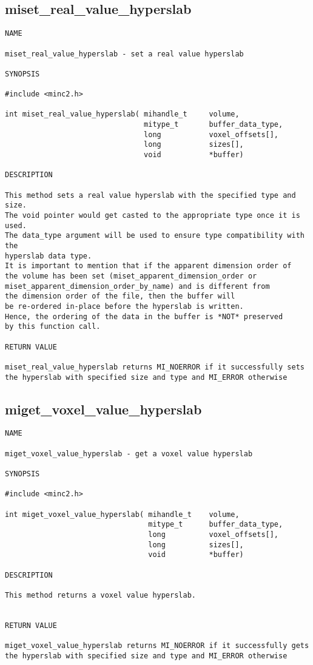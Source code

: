 \documentclass{article}
\begin{document}
\subsection{miset\_real\_value\_hyperslab}
\begin{verbatim}
NAME

miset_real_value_hyperslab - set a real value hyperslab

SYNOPSIS

#include <minc2.h>

int miset_real_value_hyperslab( mihandle_t     volume,
                                mitype_t       buffer_data_type,
                                long           voxel_offsets[],
                                long           sizes[],
                                void           *buffer)

DESCRIPTION

This method sets a real value hyperslab with the specified type and size. 
The void pointer would get casted to the appropriate type once it is used. 
The data_type argument will be used to ensure type compatibility with the 
hyperslab data type. 
It is important to mention that if the apparent dimension order of 
the volume has been set (miset_apparent_dimension_order or 
miset_apparent_dimension_order_by_name) and is different from 
the dimension order of the file, then the buffer will
be re-ordered in-place before the hyperslab is written.  
Hence, the ordering of the data in the buffer is *NOT* preserved 
by this function call.

RETURN VALUE

miset_real_value_hyperslab returns MI_NOERROR if it successfully sets
the hyperslab with specified size and type and MI_ERROR otherwise
\end{verbatim}

\subsection{miget\_voxel\_value\_hyperslab}
\begin{verbatim}
NAME

miget_voxel_value_hyperslab - get a voxel value hyperslab

SYNOPSIS

#include <minc2.h>

int miget_voxel_value_hyperslab( mihandle_t    volume,
                                 mitype_t      buffer_data_type,
                                 long          voxel_offsets[],
                                 long          sizes[],
                                 void          *buffer)

DESCRIPTION

This method returns a voxel value hyperslab.


RETURN VALUE

miget_voxel_value_hyperslab returns MI_NOERROR if it successfully gets 
the hyperslab with specified size and type and MI_ERROR otherwise
\end{verbatim}
\end{document}
